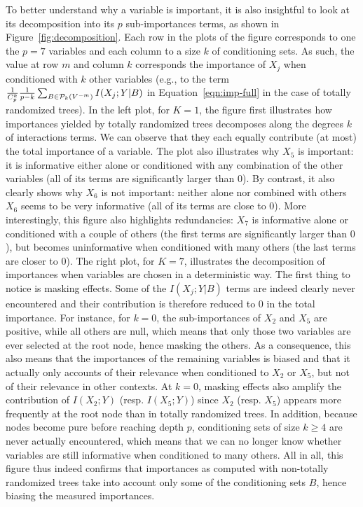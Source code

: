 To better understand why a variable is important, it is also insightful to look
at its decomposition into its $p$ sub-importances terms, as shown in
Figure~\ref{fig:decomposition}. Each row in the plots of the figure corresponds
to one the $p=7$ variables and each column to a size $k$ of conditioning sets.
As such, the value at row $m$ and column $k$ corresponds the importance of $X_j$
when conditioned with $k$ other variables (e.g., to the term $\frac{1}{C^k_p}
\frac{1}{p-k} \sum_{B \in {\cal P}_k(V^{-m})} I(X_j;Y|B)$ in Equation~\ref{eqn:imp-full}
in the case of totally randomized trees). In the left plot, for
$K=1$, the figure first illustrates how importances yielded by totally
randomized trees decomposes along the degrees $k$ of interactions terms. We can
observe that they each equally contribute (at most) the total importance of a
variable. The plot also illustrates why $X_5$ is important: it is informative
either alone or conditioned with any combination of the other variables (all of
its terms are significantly larger than $0$). By contrast, it also clearly shows
why $X_6$ is not important: neither alone nor combined with others $X_6$ seems
to be very informative (all of its terms are close to $0$). More interestingly,
this figure also highlights redundancies: $X_7$ is informative alone or
conditioned with a couple of others (the first terms are significantly larger
than $0$), but becomes uninformative  when conditioned with
many others (the last terms are closer to $0$). The right plot, for $K=7$,
illustrates the decomposition of importances when variables are chosen in a
deterministic way. The first thing to notice is masking effects. Some of the
$I(X_j;Y|B)$ terms are indeed clearly never encountered and their contribution
is therefore reduced to $0$ in the total importance. For instance, for $k=0$,
the sub-importances of $X_2$ and $X_5$ are positive, while all others are null,
which means that only those two variables are ever selected at the root node,
hence masking the others. As a consequence, this also means that the importances
of the remaining variables is biased and that it actually only accounts of their
relevance when conditioned to $X_2$ or $X_5$, but not of their relevance in
other contexts. At $k=0$, masking effects also amplify the contribution of $I(X_2;Y)$
(resp. $I(X_5;Y)$) since $X_2$ (resp. $X_5$) appears more frequently at the root
node than in totally randomized trees. In addition, because nodes become pure
before reaching depth $p$, conditioning sets of size $k\geq4$ are never actually
encountered, which means that we can no longer know whether variables are still
informative when conditioned to many others. All in all, this figure thus indeed
confirms that importances as computed with non-totally randomized trees take
into account only some of the conditioning sets $B$, hence biasing the measured
importances.

